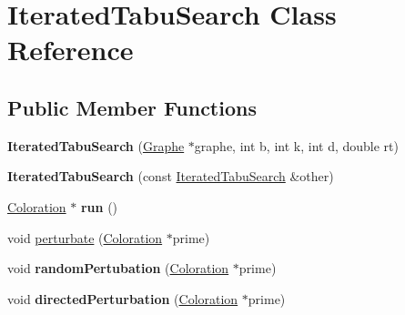 \hypertarget{classIteratedTabuSearch}{\section{Iterated\-Tabu\-Search Class Reference}
\label{classIteratedTabuSearch}
}
\subsection*{Public Member Functions}
\begin{DoxyCompactItemize}
\item 
\hypertarget{classIteratedTabuSearch_a6bee2ea80a7e2e75781b059c32f9befb}{{\bfseries Iterated\-Tabu\-Search} (\hyperlink{classGraphe}{Graphe} $\ast$graphe, int b, int k, int d, double rt)}\label{classIteratedTabuSearch_a6bee2ea80a7e2e75781b059c32f9befb}

\item 
\hypertarget{classIteratedTabuSearch_adf8b9a7b53b2c696e435140ff2b030d1}{{\bfseries Iterated\-Tabu\-Search} (const \hyperlink{classIteratedTabuSearch}{Iterated\-Tabu\-Search} \&other)}\label{classIteratedTabuSearch_adf8b9a7b53b2c696e435140ff2b030d1}

\item 
\hypertarget{classIteratedTabuSearch_a4c1498ec384fee4efd53cabf6a26e8c2}{\hyperlink{classColoration}{Coloration} $\ast$ {\bfseries run} ()}\label{classIteratedTabuSearch_a4c1498ec384fee4efd53cabf6a26e8c2}

\item 
void \hyperlink{classIteratedTabuSearch_a4e611b28f46f046ada3ea38f8397ec53}{perturbate} (\hyperlink{classColoration}{Coloration} $\ast$prime)
\item 
\hypertarget{classIteratedTabuSearch_a475254474fe7d255207818bb30e1d064}{void {\bfseries random\-Pertubation} (\hyperlink{classColoration}{Coloration} $\ast$prime)}\label{classIteratedTabuSearch_a475254474fe7d255207818bb30e1d064}

\item 
\hypertarget{classIteratedTabuSearch_aedcf5ba09e5d4b4c8e8a393b10daa651}{void {\bfseries directed\-Perturbation} (\hyperlink{classColoration}{Coloration} $\ast$prime)}\label{classIteratedTabuSearch_aedcf5ba09e5d4b4c8e8a393b10daa651}


\end{DoxyCompactItemize}
